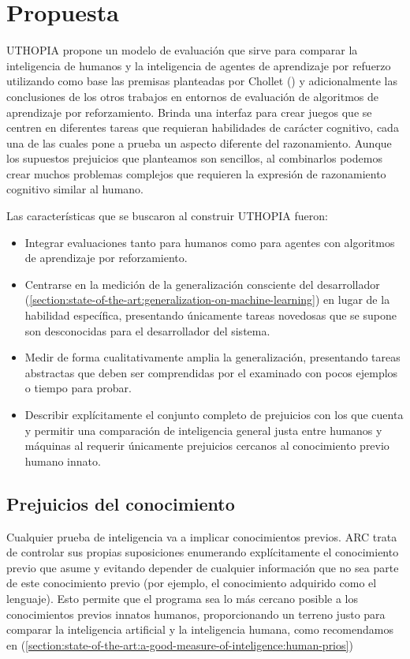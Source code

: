 \chapter{Propuesta}\label{chapter:proposal}

UTHOPIA propone un modelo de evaluación que sirve para comparar la inteligencia de humanos y la inteligencia de agentes de aprendizaje por refuerzo utilizando como base las premisas planteadas por Chollet (\cite{chollet2019measure}) y adicionalmente las conclusiones de los otros trabajos en entornos de evaluación de algoritmos de aprendizaje por reforzamiento. Brinda una interfaz para crear juegos que se centren en diferentes tareas que requieran habilidades de carácter cognitivo, cada una de las cuales pone a prueba un aspecto diferente del razonamiento. Aunque los supuestos prejuicios que planteamos son sencillos, al combinarlos podemos crear muchos problemas complejos que requieren la expresión de razonamiento cognitivo similar al humano.

Las características que se buscaron al construir UTHOPIA fueron:

\begin{itemize}
    \item Integrar evaluaciones tanto para humanos como para agentes con algoritmos de aprendizaje por reforzamiento.
    \item Centrarse en la medición de la generalización consciente del desarrollador (\ref{section:state-of-the-art:generalization-on-machine-learning}) en lugar de la habilidad específica, presentando únicamente tareas novedosas que se supone son desconocidas para el desarrollador del sistema.
    \item Medir de forma cualitativamente amplia la generalización, presentando tareas abstractas que deben ser comprendidas por el examinado con pocos ejemplos o tiempo para probar.
    \item Describir explícitamente el conjunto completo de prejuicios con los que cuenta y permitir una comparación de inteligencia general justa entre humanos y máquinas al requerir únicamente prejuicios cercanos al conocimiento previo humano innato.
\end{itemize}

\section{Prejuicios del conocimiento} 

Cualquier prueba de inteligencia va a implicar conocimientos previos. ARC trata de controlar sus propias suposiciones enumerando explícitamente el conocimiento previo que asume y evitando depender de cualquier información que no sea parte de este conocimiento previo (por ejemplo, el conocimiento adquirido como el lenguaje). Esto permite que el programa sea lo más cercano posible a los conocimientos previos innatos humanos, proporcionando un terreno justo para comparar la inteligencia artificial y la inteligencia humana, como recomendamos en (\ref{section:state-of-the-art:a-good-measure-of-inteligence:human-prios})

